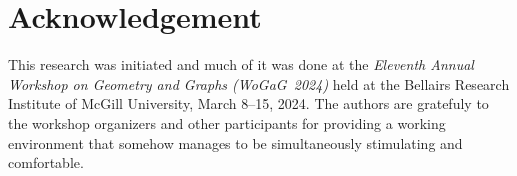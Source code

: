 \documentclass{patmorin}
\begin{document}
\section*{Acknowledgement}

This research was initiated and much of it was done at the \emph{Eleventh Annual Workshop on Geometry and Graphs (WoGaG~2024)} held at the Bellairs Research Institute of McGill University, March 8--15, 2024. The authors are gratefuly to the workshop organizers and other participants for providing a working environment that somehow manages to be simultaneously stimulating and comfortable.




\end{document}

